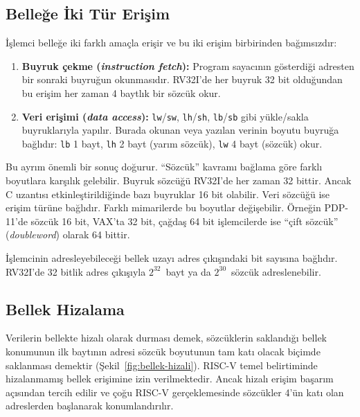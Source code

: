 \subsection{Belleğe İki Tür Erişim}
İşlemci belleğe iki farklı amaçla erişir ve bu iki erişim birbirinden bağımsızdır:

\begin{enumerate}[nosep]
\item \textbf{Buyruk çekme (\emph{instruction fetch}):} Program sayacının gösterdiği adresten bir sonraki buyruğun okunmasıdır. RV32I'de her buyruk 32 bit olduğundan bu erişim her zaman 4 baytlık bir sözcük okur.
\item \textbf{Veri erişimi (\emph{data access}):} \texttt{lw}/\texttt{sw}, \texttt{lh}/\texttt{sh}, \texttt{lb}/\texttt{sb} gibi yükle/sakla buyruklarıyla yapılır. Burada okunan veya yazılan verinin boyutu buyruğa bağlıdır: \texttt{lb} 1 bayt, \texttt{lh} 2 bayt (yarım sözcük), \texttt{lw} 4 bayt (sözcük) okur.
\end{enumerate}

Bu ayrım önemli bir sonuç doğurur. ``Sözcük'' kavramı bağlama göre farklı boyutlara karşılık gelebilir. Buyruk sözcüğü RV32I'de her zaman 32 bittir. Ancak C uzantısı etkinleştirildiğinde bazı buyruklar 16 bit olabilir. Veri sözcüğü ise erişim türüne bağlıdır. Farklı mimarilerde bu boyutlar değişebilir. Örneğin PDP-11'de sözcük 16 bit, VAX'ta 32 bit, çağdaş 64 bit işlemcilerde ise ``çift sözcük'' (\emph{doubleword}) olarak 64 bittir.

İşlemcinin adresleyebileceği bellek uzayı adres çıkışındaki bit sayısına bağlıdır. RV32I'de 32 bitlik adres çıkışıyla $2^{32}$~bayt ya da $2^{30}$~sözcük adreslenebilir.

\subsection{Bellek Hizalama}
Verilerin bellekte hizalı olarak durması demek, sözcüklerin saklandığı bellek konumunun ilk baytının adresi sözcük boyutunun tam katı olacak biçimde saklanması demektir (Şekil~\ref{fig:bellek-hizali}). RISC-V temel belirtiminde hizalanmamış bellek erişimine izin verilmektedir. Ancak hizalı erişim başarım açısından tercih edilir ve çoğu RISC-V gerçeklemesinde sözcükler 4'ün katı olan adreslerden başlanarak konumlandırılır.

